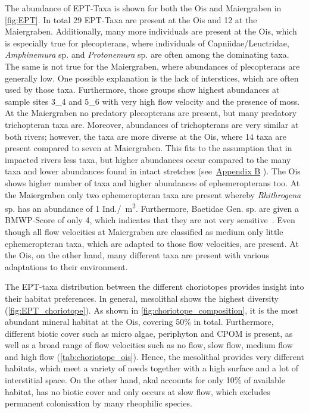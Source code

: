 The abundance of EPT-Taxa is shown for both the Ois and Maiergraben in \cref{fig:EPT}. In total 29 EPT-Taxa are present at the Ois and 12 at the Maiergraben. Additionally, many more individuals are present at the Ois, which is especially true for plecopterans, where individuals of Capniidae/Leuctridae, \emph{Amphinemura} sp. and \emph{Protonemura} sp. are often among the dominating taxa. The same is not true for the Maiergraben, where abundances of plecopterans are generally low. One possible explanation is the lack of interstices, which are often used by those taxa. Furthermore, those groups show highest abundances at sample sites 3\_4 and 5\_6 with very high flow velocity and the presence of moss. At the Maiergraben no predatory plecopterans are present, but many predatory trichopteran taxa are. Moreover, abundances of trichopterans are very similar at both rivers; however, the taxa are more diverse at the Ois, where 14 taxa are present compared to seven at Maiergraben. This fits to the assumption that in impacted rivers less taxa, but higher abundances occur compared to the many taxa and lower abundances found in intact stretches (see~\hyperref[appendixB]{Appendix B} ). The Ois shows higher number of taxa and higher abundances of ephemeropterans too. At the Maiergraben only two ephemeropteran taxa are present whereby \emph{Rhithrogena} sp. has an abundance of 1 Ind./\SI{}{\square\meter}. Furthermore, Baetidae Gen. sp. are given a BMWP-Score of only 4, which indicates that they are not very sensitive~. Even though all flow velocities at Maiergraben are classified as medium only little ephemeropteran taxa, which are adapted to those flow velocities, are present. At the Ois, on the other hand, many different taxa are present with various adaptations to their environment.

The EPT-taxa distribution between the different choriotopes provides insight into their habitat preferences.
In general, mesolithal shows the highest diversity (\cref{fig:EPT_choriotope}). As shown in \cref{fig:choriotope_composition}, it is the most abundant mineral habitat at the Ois, covering 50\% in total. Furthermore, different biotic cover such as micro algae, periphyton and CPOM is present, as well as a broad range of flow velocities such as no flow, slow flow, medium flow and high flow (\cref{tab:choriotope_ois}). Hence, the mesolithal provides very different habitats, which meet a variety of needs together with a high surface and a lot of interstitial space. On the other hand, akal accounts for only 10\% of available habitat, has no biotic cover and only occurs at slow flow, which excludes permanent colonisation by many rheophilic species.



